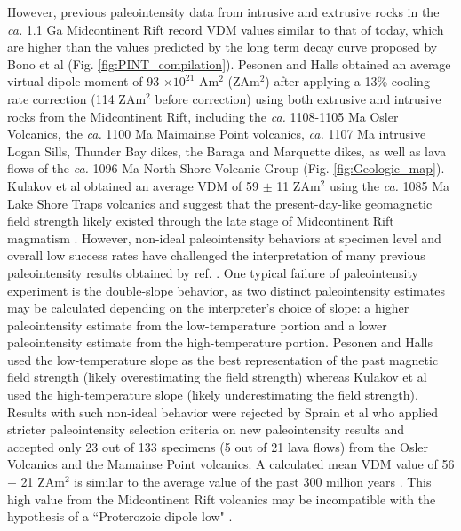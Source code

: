 \documentclass[9pt,twocolumn,twoside,lineno]{pnas-new}
\begin{document}
However, previous paleointensity data from intrusive and extrusive rocks in the \textit{ca.} 1.1 Ga Midcontinent Rift \cite{Pesonen1983a, Kulakov2013a, Sprain2018a} record VDM values similar to that of today, which are higher than the values predicted by the long term decay curve proposed by Bono et al \cite{Bono2019a} (Fig. \ref{fig:PINT_compilation}). Pesonen and Halls \cite{Pesonen1983b} obtained an average virtual dipole moment of 93 $\times 10^21$ Am$^2$ (ZAm$^2$) after applying a 13\% cooling rate correction (114 ZAm$^2$ before correction) using both extrusive and intrusive rocks from the Midcontinent Rift, including the \textit{ca.} 1108-1105 Ma Osler Volcanics, the \textit{ca.} 1100 Ma Maimainse Point volcanics, \textit{ca.} 1107 Ma intrusive Logan Sills, Thunder Bay dikes, the Baraga and Marquette dikes, as well as lava flows of the \textit{ca.} 1096 Ma North Shore Volcanic Group (Fig. \ref{fig:Geologic_map}). Kulakov et al \cite{Kulakov2013a} obtained an average VDM of 59 $\pm$ 11 ZAm$^2$ using the \textit{ca.} 1085 Ma Lake Shore Traps volcanics and suggest that the present-day-like geomagnetic field strength likely existed through the late stage of Midcontinent Rift magmatism \cite{Vervoort2007a, Miller2013a}. However, non-ideal paleointensity behaviors at specimen level and overall low success rates have challenged the interpretation of many previous paleointensity results obtained by ref. \citealp{Pesonen1983b, Kulakov2013a}. One typical failure of paleointensity experiment is the double-slope behavior, as two distinct paleointensity estimates may be calculated depending on the interpreter's choice of slope: a higher paleointensity estimate from the low-temperature portion and a lower paleointensity estimate from the high-temperature portion. Pesonen and Halls \cite{Pesonen1983a} used the low-temperature slope as the best representation of the past magnetic field strength (likely overestimating the field strength) whereas Kulakov et al \cite{Kulakov2013a} used the high-temperature slope (likely underestimating the field strength). Results with such non-ideal behavior were rejected by Sprain et al \cite{Sprain2018a} who applied stricter paleointensity selection criteria on new paleointensity results and accepted only 23 out of 133 specimens (5 out of 21 lava flows) from the Osler Volcanics and the Mamainse Point volcanics. A calculated mean VDM value of 56 $\pm$ 21 ZAm$^2$ is similar to the average value of the past 300 million years \cite{Sprain2018a}. This high value from the Midcontinent Rift volcanics may be incompatible with the hypothesis of a ``Proterozoic dipole low" \cite{Biggin2009a}. 
\end{document}
